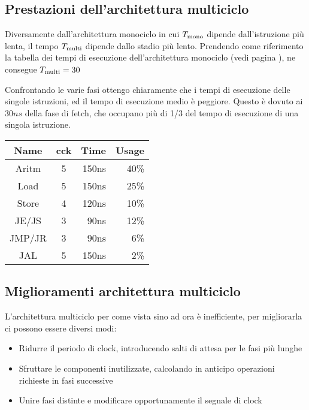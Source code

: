 \documentclass[../ace.tex]{subfiles}
\begin{document}
\subsection{Prestazioni dell'architettura multiciclo}
\begin{minipage}[t]{.66\textwidth}
    \vspace{0pt}
    Diversamente dall'architettura monociclo in cui $T_\text{mono}$ dipende dall'istruzione più lenta, il tempo $T_\text{multi}$ dipende dallo
    stadio più lento.
    Prendendo come riferimento la tabella dei tempi di esecuzione dell'architettura monociclo (vedi pagina
    \pageref{tab:tempi_esecuzione_monociclo}), ne consegue $T_\text{multi} =30$

    Confrontando le varie fasi ottengo chiaramente che i tempi di esecuzione delle singole istruzioni, ed il tempo di
    esecuzione medio è peggiore. Questo è dovuto ai $30ns$ della fase di fetch, che occupano più di 1/3 del tempo di
    esecuzione di una singola istruzione.
\end{minipage}
\begin{minipage}[t]{.33\textwidth}
    \footnotesize
    \let\fs\tiny
    \vspace{-2em}
    \begin{center}
        \begin{tabu}{|c|c|r|r|}
            \hline
            \rowfont{\bfseries\centering}
            Name & cck & Time & Usage \\
            \hline
            \hline
            Aritm  & 5& 150ns &40\fs\%\\
            \hline
            Load & 5& 150ns   &25\fs\%\\
            \hline
            Store & 4& 120ns  &10\fs\%\\
            \hline
            JE/JS& 3& 90ns    &12\fs\%\\
            \hline
            JMP/JR& 3& 90ns   &6\fs\%\\
            \hline
            JAL& 5& 150ns     &2\fs\%\\
            \hline
        \end{tabu}
    \end{center}
\end{minipage}

\subsection{Miglioramenti architettura multiciclo}
L'architettura multiciclo per come vista sino ad ora è inefficiente, per migliorarla ci possono essere diversi modi:
\begin{itemize}
    \item Ridurre il periodo di clock, introducendo salti di attesa per le fasi più lunghe
    \item Sfruttare le componenti inutilizzate, calcolando in anticipo operazioni richieste in fasi successive
    \item Unire fasi distinte e modificare opportunamente il segnale di clock
\end{itemize}
\end{document}

